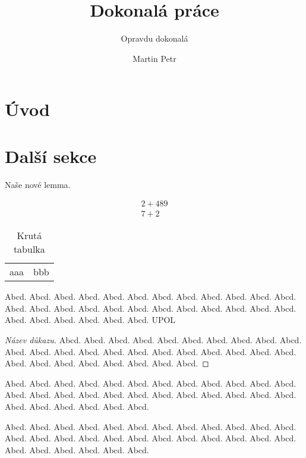 \documentclass[12pt]{article}
\title{Dokonalá práce}						%
\subtitle{Opravdu dokonalá}
\author{Martin Petr}
\begin{document}
\maketitle

\section{Úvod}

\section{Další sekce}

\begin{lemma}
Naše nové lemma.
\end{lemma}

\begin{align}
2+489 \\
7+2
\end{align}


\begin{table}
\begin{tabular}{c | c}
aaa & bbb 
\end{tabular}
\caption{Krutá tabulka}
\end{table}



\begin{definition}
Abcd. Abcd. Abcd. Abcd. Abcd. Abcd. Abcd. Abcd. Abcd. Abcd. Abcd. Abcd. Abcd. Abcd. Abcd. Abcd. Abcd. Abcd. Abcd. Abcd. Abcd. Abcd. Abcd. Abcd. Abcd. Abcd. Abcd. Abcd. Abcd. Abcd. \gls{UPOL}
\end{definition}

\begin{proof}[Název důkazu]
Abcd. Abcd. Abcd. Abcd. Abcd. Abcd. Abcd. Abcd. Abcd. Abcd. Abcd. Abcd. Abcd. Abcd. Abcd. Abcd. Abcd. Abcd. Abcd. Abcd. Abcd. Abcd. Abcd. Abcd. Abcd. Abcd. Abcd. Abcd. Abcd. Abcd. 
\end{proof}

\begin{remark}
Abcd. Abcd. Abcd. Abcd. Abcd. Abcd. Abcd. Abcd. Abcd. Abcd. Abcd. Abcd. Abcd. Abcd. Abcd. Abcd. Abcd. Abcd. Abcd. Abcd. Abcd. Abcd. Abcd. Abcd. Abcd. Abcd. Abcd. Abcd. Abcd. Abcd. 
\end{remark}

\begin{example}
Abcd. Abcd. Abcd. Abcd. Abcd. Abcd. Abcd. Abcd. Abcd. Abcd. Abcd. Abcd. Abcd. Abcd. Abcd. Abcd. Abcd. Abcd. Abcd. Abcd. Abcd. Abcd. Abcd. Abcd. Abcd. Abcd. Abcd. Abcd. Abcd. Abcd. 
\end{example}
\end{document}
